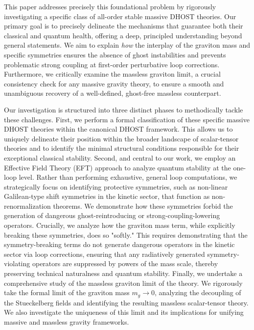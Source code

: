 \documentclass[twocolumn]{aastex631}
\begin{document}
This paper addresses precisely this foundational problem by rigorously investigating a specific class of all-order stable massive DHOST theories. Our primary goal is to precisely delineate the mechanisms that guarantee both their classical and quantum health, offering a deep, principled understanding beyond general statements. We aim to explain \textit{how} the interplay of the graviton mass and specific symmetries ensures the absence of ghost instabilities and prevents problematic strong coupling at first-order perturbative loop corrections. Furthermore, we critically examine the massless graviton limit, a crucial consistency check for any massive gravity theory, to ensure a smooth and unambiguous recovery of a well-defined, ghost-free massless counterpart.

Our investigation is structured into three distinct phases to methodically tackle these challenges. First, we perform a formal classification of these specific massive DHOST theories within the canonical DHOST framework. This allows us to uniquely delineate their position within the broader landscape of scalar-tensor theories and to identify the minimal structural conditions responsible for their exceptional classical stability. Second, and central to our work, we employ an Effective Field Theory (EFT) approach to analyze quantum stability at the one-loop level. Rather than performing exhaustive, general loop computations, we strategically focus on identifying protective symmetries, such as non-linear Galilean-type shift symmetries in the kinetic sector, that function as non-renormalization theorems. We demonstrate how these symmetries forbid the generation of dangerous ghost-reintroducing or strong-coupling-lowering operators. Crucially, we analyze how the graviton mass term, while explicitly breaking these symmetries, does so "softly." This requires demonstrating that the symmetry-breaking terms do not generate dangerous operators in the kinetic sector via loop corrections, ensuring that any radiatively generated symmetry-violating operators are suppressed by powers of the mass scale, thereby preserving technical naturalness and quantum stability. Finally, we undertake a comprehensive study of the massless graviton limit of the theory. We rigorously take the formal limit of the graviton mass $m_g \to 0$, analyzing the decoupling of the Stueckelberg fields and identifying the resulting massless scalar-tensor theory. We also investigate the uniqueness of this limit and its implications for unifying massive and massless gravity frameworks.
\end{document}
